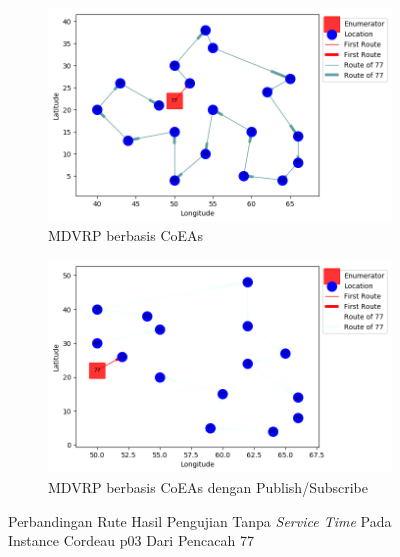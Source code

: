 \begin{figure}[H]
	\centering
	\begin{subfigure}[t]{\textwidth}
		\centering
		\includegraphics[width=\textwidth]{Resources/Images/cordeau_p03/cordeau_p03_notw_77_coes}
		\caption{MDVRP berbasis CoEAs}
		\label{fig:cordeau_p03_notw_77_coes}
	\end{subfigure}
	\begin{subfigure}[t]{\textwidth}
		\centering
		\includegraphics[width=\textwidth]{Resources/Images/cordeau_p03/cordeau_p03_notw_77_pubsub_coes}
		\caption{MDVRP berbasis CoEAs dengan Publish/Subscribe}
		\label{fig:cordeau_p03_notw_77_pubsub_coes}
	\end{subfigure}
	\caption{Perbandingan Rute Hasil Pengujian Tanpa \textit{Service Time} Pada Instance Cordeau p03 Dari Pencacah 77}
	\label{fig:cordeau_p03_notw_77}
\end{figure}


